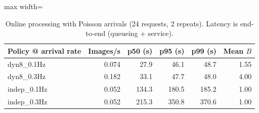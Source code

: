 \begin{table}[!t]
\centering
\scriptsize
\caption{Online processing with Poisson arrivals (24 requests, 2 repeats). Latency is end-to-end (queueing + service).}
\label{tab:exp2_online}
\begin{adjustbox}{max width=\textwidth}
\begin{tabular}{lrrrrr}
\toprule
Policy @ arrival rate & Images/s & p50 (s) & p95 (s) & p99 (s) & Mean $B$ \\
\midrule
dyn8\_0.1Hz & 0.074 & 27.9 & 46.1 & 48.7 & 1.55 \\
dyn8\_0.3Hz & 0.182 & 33.1 & 47.7 & 48.0 & 4.00 \\
indep\_0.1Hz & 0.052 & 134.3 & 180.5 & 185.2 & 1.00 \\
indep\_0.3Hz & 0.052 & 215.3 & 350.8 & 370.6 & 1.00 \\
\bottomrule
\end{tabular}
\end{adjustbox}
\end{table}
